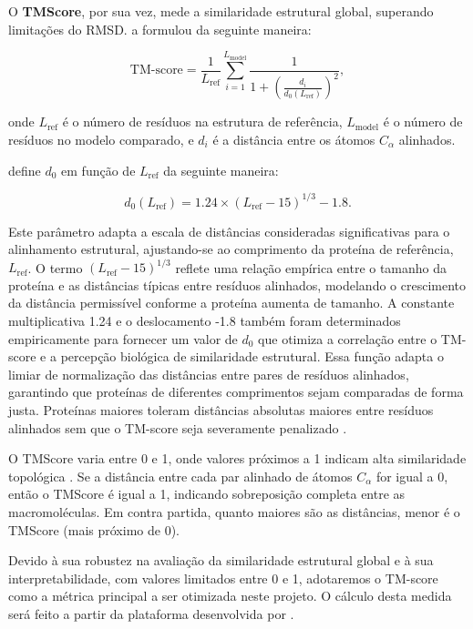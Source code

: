 O \textbf{TMScore}, por sua vez,
mede a similaridade estrutural global, superando limitações do RMSD. \cite{tmscore} a formulou da seguinte maneira:

\begin{equation}
    \text{TM-score} = \frac{1}{L_{\text{ref}}} \sum_{i=1}^{L_{\text{model}}} \frac{1}{1 + \left(\frac{d_i}{d_0(L_{\text{ref}})}\right)^2},
\end{equation}

onde \(L_{\text{ref}}\) é o número de resíduos na estrutura de referência,
 \(L_{\text{model}}\) é o número de resíduos no modelo comparado, 
 e \(d_i\) é a distância entre os átomos \(C_\alpha\) alinhados. 
 
 \cite{tmscore} define \(d_0\) em função de \(L_{\text{ref}}\) da seguinte maneira:

\begin{equation}
    d_0(L_{\text{ref}}) = 1.24 \times (L_{\text{ref}} - 15)^{1/3} - 1.8.
\end{equation}

Este parâmetro adapta a escala de distâncias consideradas significativas para o alinhamento estrutural,
ajustando-se ao comprimento da proteína de referência, \( L_{\text{ref}} \). 
O termo \( (L_{\text{ref}} - 15)^{1/3} \) 
reflete uma relação empírica entre o tamanho da proteína e as distâncias típicas entre resíduos alinhados,
modelando o crescimento da distância permissível conforme a proteína aumenta de tamanho.
A constante multiplicativa 1.24 e o deslocamento -1.8 também foram determinados empiricamente para fornecer 
um valor de \( d_0 \) que otimiza a correlação entre o TM-score e a percepção biológica de similaridade estrutural.
Essa função adapta o limiar de normalização das distâncias entre pares de resíduos alinhados,
garantindo que proteínas de diferentes comprimentos sejam comparadas de forma justa.
Proteínas maiores toleram distâncias absolutas maiores entre resíduos alinhados sem que o TM-score seja severamente penalizado \cite{tmscore}.
 

O TMScore varia entre 0 e 1, onde valores próximos a 1 indicam alta similaridade topológica \cite{tmscore}.
Se a distância entre cada par alinhado de átomos \(C_\alpha\) for igual a 0, então o TMScore é igual a 1, indicando sobreposição completa 
entre as macromoléculas. Em contra partida, quanto maiores são as distâncias, menor é o TMScore (mais próximo de 0).

Devido à sua robustez na avaliação da similaridade estrutural global e à sua interpretabilidade,
com valores limitados entre 0 e 1, adotaremos o TM-score como a métrica principal a ser otimizada neste projeto.
O cálculo desta medida será feito a partir da plataforma desenvolvida por \cite{USalign}.


